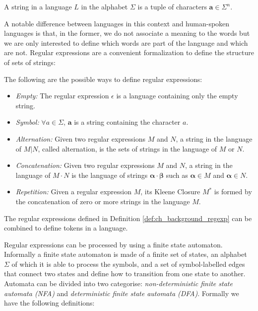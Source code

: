 \begin{definition}
	A string in a language $L$ in the alphabet $\Sigma$ is a tuple of characters $\mathbf{a} \in \Sigma^{n}$.
\end{definition}

 A notable difference between  languages in this context and human-spoken languages is that, in the former, we do not associate a meaning to the words but we are only interested to define which words are part of the language and which are not. Regular expressions are a convenient formalization to define the structure of sets of strings:

\begin{definition}
	\label{def:ch_background_regexp}
	 The following are the possible ways to define regular expressions:
	\begin{itemize}[noitemsep]
		\item \textit{Empty:} The regular expression $\epsilon$ is a language containing only the empty string.
		\item \textit{Symbol:} $\forall a \in \Sigma$, $\mathbf{a}$ is a string containing the character $a$.
		\item \textit{Alternation:} Given two regular expressions $M$ and $N$, a string in the language of $M | N$, called alternation, is the sets of strings in the language of $M$ or $N$.
		\item \textit{Concatenation:} Given two regular expressions $M$ and $N$, a string in the language of $M \cdot N$ is the language of strings $\mathbf{\alpha \cdot \beta}$ such as $\mathbf{\alpha} \in M$ and $\mathbf{\alpha} \in N$.
		\item \textit{Repetition:} Given a regular expression $M$, its Kleene Closure $M^{*}$ is formed by the concatenation of zero or more strings in the language $M$.
	\end{itemize}
\end{definition}

The regular expressions defined in Definition \ref{def:ch_background_regexp} can be combined to define tokens in a language.

Regular expressions can be processed by using a finite state automaton. Informally a finite state automaton is made of a finite set of states, an alphabet $\Sigma$ of which it is able to process the symbols, and a set of symbol-labelled edges that connect two states and define how to transition from one state to another. Automata can be divided into two categorise: \textit{non-deterministic finite state automata (NFA)} and \textit{deterministic finite state automata (DFA)}. Formally we have the following definitions:

